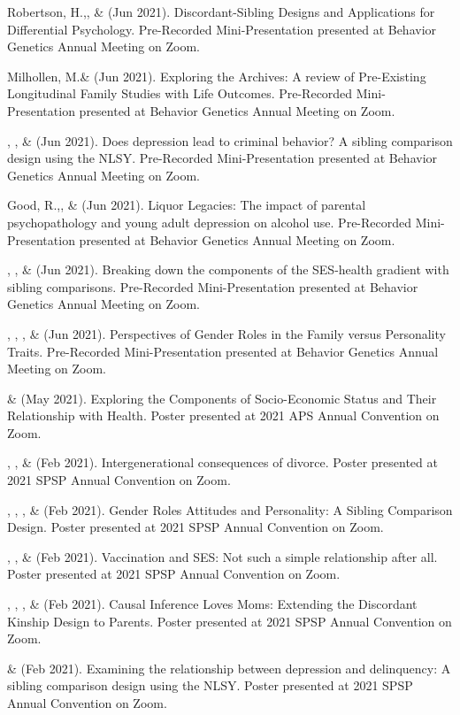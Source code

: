 \begin{etaremune}
%
\item Robertson, H.,\noteA \Joe, \&  \meb (Jun 2021). Discordant-Sibling Designs and Applications for Differential Psychology. Pre-Recorded Mini-Presentation presented at Behavior Genetics Annual Meeting on Zoom.
%
\item Milhollen, M.\noteA \&  \meb (Jun 2021). Exploring the Archives: A review of Pre-Existing Longitudinal Family Studies with Life Outcomes. Pre-Recorded Mini-Presentation presented at Behavior Genetics Annual Meeting on Zoom.
%
\item \emsims, \jt, \&  \meb (Jun 2021). Does depression lead to criminal behavior? A sibling comparison design using the NLSY. Pre-Recorded Mini-Presentation presented at Behavior Genetics Annual Meeting on Zoom.
%
\item Good, R.,\noteA \yrh, \&  \meb (Jun 2021). Liquor Legacies: The impact of parental psychopathology and young adult depression on alcohol use. Pre-Recorded Mini-Presentation presented at Behavior Genetics Annual Meeting on Zoom.
%
\item \yrh, \jt, \& \meb (Jun 2021). Breaking down the components of the SES-health gradient with sibling comparisons. Pre-Recorded Mini-Presentation presented at Behavior Genetics Annual Meeting on Zoom.
%
\item \sherrym, \yrh, \jt, \& \meb (Jun 2021). Perspectives of Gender Roles in the Family versus Personality Traits.  Pre-Recorded Mini-Presentation presented at Behavior Genetics Annual Meeting on Zoom.
%
\item \yrh \& \meb (May 2021). Exploring the Components of Socio-Economic Status and Their Relationship with Health. Poster presented at 2021 APS Annual Convention on Zoom.
%
\item \kl, \jt, \& \meb (Feb 2021). Intergenerational consequences of divorce. Poster presented at 2021 SPSP Annual Convention on Zoom.
%
\item \sherrym, \yrh, \jt, \& \meb (Feb 2021). Gender Roles Attitudes and Personality: A Sibling Comparison Design. Poster presented at 2021 SPSP Annual Convention on Zoom.
%
\item \jt, \kl, \& \meb (Feb 2021). Vaccination and SES: Not such a simple relationship after all. Poster presented at 2021 SPSP Annual Convention on Zoom.
%
\item \meb, \emsims, \jt, \& \kl  (Feb 2021). Causal Inference Loves Moms: Extending the Discordant Kinship Design to Parents. Poster presented at 2021 SPSP Annual Convention on Zoom.
%
\item \emsims\hspace* {2 pt} \& \meb (Feb 2021). Examining the relationship between depression and delinquency: A sibling comparison design using the NLSY. Poster presented at 2021 SPSP Annual Convention on Zoom.

\end{etaremune}
